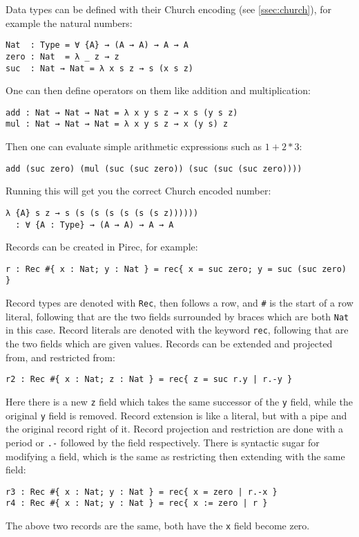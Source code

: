 Data types can be defined with their Church encoding (see \cref{ssec:church}),
for example the natural numbers:
\begin{verbatim}
Nat  : Type = ∀ {A} → (A → A) → A → A
zero : Nat  = λ _ z → z
suc  : Nat → Nat = λ x s z → s (x s z)
\end{verbatim}
One can then define operators on them like addition and multiplication:
\begin{verbatim}
add : Nat → Nat → Nat = λ x y s z → x s (y s z)
mul : Nat → Nat → Nat = λ x y s z → x (y s) z
\end{verbatim}
Then one can evaluate simple arithmetic expressions such as \(1 + 2 * 3\):
\begin{verbatim}
add (suc zero) (mul (suc (suc zero)) (suc (suc (suc zero))))
\end{verbatim}
Running this will get you the correct Church encoded number:
\begin{verbatim}
λ {A} s z → s (s (s (s (s (s (s z))))))
  : ∀ {A : Type} → (A → A) → A → A
\end{verbatim}

Records can be created in Pirec, for example:
\begin{verbatim}
r : Rec #{ x : Nat; y : Nat } = rec{ x = suc zero; y = suc (suc zero) }
\end{verbatim}
Record types are denoted with \texttt{Rec}, then
follows a row, and \texttt{#} is the start of a row
literal, following that are the two fields surrounded by braces which are both
\texttt{Nat} in this case. Record literals are
denoted with the keyword \texttt{rec}, following
that are the two fields which are given values. Records can be extended and
projected from, and restricted from:
\begin{verbatim}
r2 : Rec #{ x : Nat; z : Nat } = rec{ z = suc r.y | r.-y }
\end{verbatim}
Here there is a new \texttt{z} field which takes the
same successor of the \texttt{y} field, while the
original \texttt{y} field is removed. Record
extension is like a literal, but with a pipe and the original record right of
it. Record projection and restriction are done with a period or
\texttt{.-} followed by the field respectively.
There is syntactic sugar for modifying a field, which is the same as restricting then extending with the same field:
\begin{verbatim}
r3 : Rec #{ x : Nat; y : Nat } = rec{ x = zero | r.-x }
r4 : Rec #{ x : Nat; y : Nat } = rec{ x := zero | r }
\end{verbatim}
The above two records are the same, both have the
\texttt{x} field become zero.

